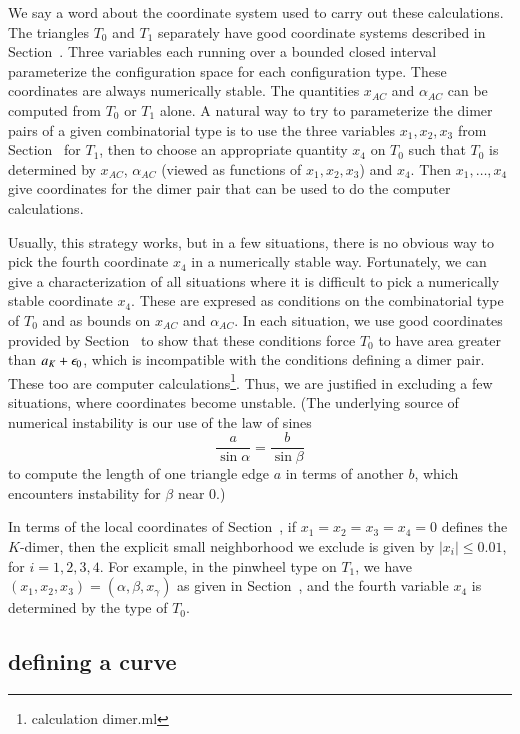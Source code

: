 We say a word about the coordinate system used to carry out these calculations.
The triangles $T_0$ and $T_1$ separately have good coordinate systems described in Section~.  Three variables
each running over a bounded closed interval parameterize the configuration space for each configuration type.
These coordinates are always numerically stable.  The quantities $x_{AC}$ and $\alpha_{AC}$ can be computed from $T_0$ or $T_1$  alone.
A natural way to try to parameterize the dimer pairs of a given combinatorial type is to use the three variables $x_1,x_2,x_3$ from Section~ for $T_1$,
then to choose an appropriate quantity $x_4$ on $T_0$ such that $T_0$ is determined by $x_{AC}$, $\alpha_{AC}$ (viewed as functions of $x_1,x_2,x_3$) and
$x_4$.  Then $x_1,\ldots,x_4$ give coordinates for the dimer pair that can be used to do the computer calculations.

Usually, this strategy works, but in a few situations, there is no obvious way to pick the fourth coordinate $x_4$ in a numerically stable way.
Fortunately, we can give a characterization of all situations where it is difficult to pick a numerically stable coordinate $x_4$.  These are
expresed as conditions on the combinatorial type of $T_0$ and as bounds on $x_{AC}$ and $\alpha_{AC}$.  In each situation, we use good
coordinates provided by Section~ to show that
these conditions force $T_0$ to have area greater than $a_K+\epsilon_0$, which is incompatible with the conditions defining a dimer pair.  
These too are computer calculations\footnote{calculation dimer.ml}.
Thus, we are justified in excluding a few situations, where coordinates become unstable.  (The underlying source of numerical instability is
our use of the law of sines 
\[
\frac{a}{\sin\alpha} = \frac{b}{\sin\beta}
\]
to compute the length of one triangle edge $a$ in terms of another $b$, which encounters instability for $\beta$ near $0$.)

In terms of the local coordinates of Section~, if $x_1=x_2=x_3=x_4=0$ defines the $K$-dimer, then the explicit
small neighborhood we exclude is given by $|x_i|\le 0.01$, for $i=1,2,3,4$.  For example, in the pinwheel type on $T_1$, 
we have $(x_1,x_2,x_3)=(\alpha,\beta,x_\gamma)$ as given in Section~, and the fourth variable $x_4$ is determined
by the type of $T_0$.

\subsection{defining a curve}\label{sec:gamma}

